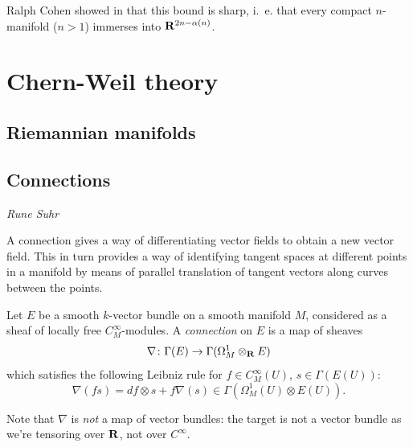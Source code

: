 \documentclass[a4paper,openany]{scrbook}
\newcommand{\chapterauthor}[1]{\hfill\emph{#1}\par\noindent}
\begin{document}
\begin{remark}
Ralph Cohen showed in \cite{cohen:immersion-conjecture} that this bound is sharp, i.~e. that every compact $n$-manifold ($n>1$) immerses into $\mathbf R^{2n-\alpha(n)}$. 
\end{remark}

\chapter{Chern-Weil theory}
%
%




\section{Riemannian manifolds}


\section{Connections}
\chapterauthor{Rune Suhr}

A connection gives a way of differentiating vector fields to obtain a new vector field. This in turn provides a way of identifying tangent spaces at different points in a manifold by means of parallel translation of tangent vectors along curves between the points.

\begin{defn}
Let $E$ be a smooth $k$-vector bundle on a smooth manifold $M$, considered as a sheaf of locally free $C^\infty_M$-modules. A \emph{connection} on $E$ is a map of sheaves
\[
\nabla\colon \Gamma (E) \to \Gamma (\Omega^1_M \otimes_\mathbf R E)
\]
which satisfies the following Leibniz rule for $f \in C^\infty_M(U)$, $s \in \Gamma (E(U))$:
\[
\nabla(fs) = df \otimes s + f \nabla(s) \in \Gamma( \Omega^1_M(U) \otimes E(U)).
\]
\end{defn}
Note that $\nabla$ is \emph{not} a map of vector bundles: the target is not a vector bundle as we're tensoring over $\mathbf R$, not over $C^\infty$.
\end{document}
